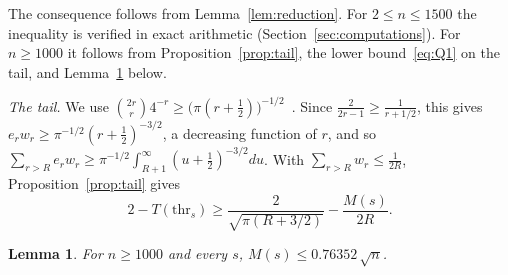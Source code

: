\documentclass[11pt]{amsart}
\newtheorem{lemma}{Lemma}[section]
\theoremstyle{remark}
\newcommand{\thr}{\mathrm{thr}}
\begin{document}
The consequence follows from Lemma~\ref{lem:reduction}. For $2\le n\le1500$ the inequality is verified in exact arithmetic (Section~\ref{sec:computations}). For $n\ge1000$ it follows from Proposition~\ref{prop:tail}, the lower bound~\eqref{eq:Q1} on the tail, and Lemma~\ref{lem:mills} below.

\emph{The tail.} We use $\binom{2r}r4^{-r}\ge\bigl(\pi(r+\frac12)\bigr)^{-1/2}$~\cite{Kaz56}. Since $\frac2{2r-1}\ge\frac1{r+1/2}$, this gives $e_rw_r\ge\pi^{-1/2}(r+\frac12)^{-3/2}$, a decreasing function of $r$, and so $\sum_{r>R}e_rw_r\ge\pi^{-1/2}\int_{R+1}^\infty(u+\frac12)^{-3/2}du$. With $\sum_{r>R}w_r\le\frac1{2R}$, Proposition~\ref{prop:tail} gives
\begin{equation}\label{eq:Q1}
 2-T(\thr_s)\ge\frac{2}{\sqrt{\pi(R+3/2)}}-\frac{M(s)}{2R}.
\end{equation}

\begin{lemma}\label{lem:mills}
For $n\ge1000$ and every $s$, $M(s)\le0.76352\,\sqrt n$.
\end{lemma}
\end{document}

